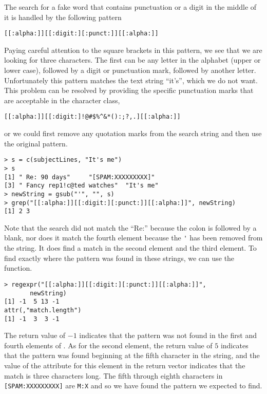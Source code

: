 The search for a fake word that contains punctuation or a digit in the
middle of it is handled by the following pattern 
{\footnotesize{
\begin{verbatim}
[[:alpha:]][[:digit:][:punct:]][[:alpha:]]
\end{verbatim}
}}
\noindent 
Paying careful attention to the square brackets in this pattern,
we see that we are looking for three characters.  The first can be any
letter in the alphabet (upper or lower case), followed by a digit or
punctuation mark, followed by another letter.  Unfortunately this pattern
matches the text string ``it's'', which we do not want.  This problem can be
resolved by providing the specific punctuation marks that are
acceptable in the character class, 
{\footnotesize{
\begin{verbatim}
[[:alpha:]][[:digit:]!@#$%^&*():;?,.][[:alpha:]]
\end{verbatim} 
}}
\noindent 
or we could first remove any quotation marks from the search
string and then use the original pattern.  
{\footnotesize{
\begin{verbatim}
> s = c(subjectLines, "It's me")
> s
[1] " Re: 90 days"     "[SPAM:XXXXXXXXX]"         
[3] " Fancy rep1!c@ted watches"  "It's me" 
> newString = gsub("'", "", s)
> grep("[[:alpha:]][[:digit:][:punct:]][[:alpha:]]", newString)
[1] 2 3
\end{verbatim}
}}
\noindent 
Note that the search did not match the ``Re:'' because the colon
is followed by a blank, nor does it match the fourth element because
the \verb+'+ has been removed from the string.  It does find a match
in the second element and the third element.  To find exactly where the pattern was found in these strings, we can use the  function.
{\footnotesize{
\begin{verbatim}
> regexpr("[[:alpha:]][[:digit:][:punct:]][[:alpha:]]",
       newString)
[1] -1  5 13 -1
attr(,"match.length")
[1] -1  3  3 -1
\end{verbatim}
}}
\noindent
The return value of $-1$ indicates that the pattern was not found in the first and fourth elements of .  As for the second element, the return value of $5$ indicates that the pattern was found beginning at the fifth character in the string, and the value of the attribute  for this element in the return vector indicates that the match is three characters long.  The fifth through eighth characters in \verb+[SPAM:XXXXXXXXX]+ are  \verb+M:X+ and so we have found the pattern we expected to find. 

